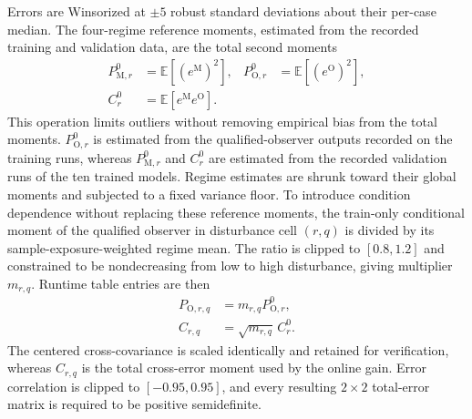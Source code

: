 \documentclass{ieeeaccess}
\begin{document}
Errors are Winsorized at $\pm5$ robust standard deviations about their per-case median. The four-regime reference moments, estimated from the recorded training and validation data, are the total second moments
\begin{equation}
\begin{aligned}
P_{\mathrm{M},r}^{0}&=\mathbb E[(e^{\mathrm{M}})^2], &
P_{\mathrm{O},r}^{0}&=\mathbb E[(e^{\mathrm{O}})^2],\\
C_{r}^{0}&=\mathbb E[e^{\mathrm{M}}e^{\mathrm{O}}].
\end{aligned}
\label{eq:fusion_empirical_moments}
\end{equation}
This operation limits outliers without removing empirical bias from the total moments. $P_{\mathrm{O},r}^{0}$ is estimated from the qualified-observer outputs recorded on the training runs, whereas $P_{\mathrm{M},r}^{0}$ and $C_r^{0}$ are estimated from the recorded validation runs of the ten trained models. Regime estimates are shrunk toward their global moments and subjected to a fixed variance floor. To introduce condition dependence without replacing these reference moments, the train-only conditional moment of the qualified observer in disturbance cell $(r,q)$ is divided by its sample-exposure-weighted regime mean. The ratio is clipped to $[0.8,1.2]$ and constrained to be nondecreasing from low to high disturbance, giving multiplier $m_{r,q}$. Runtime table entries are then
\begin{equation}
\begin{aligned}
P_{\mathrm{O},r,q}&=m_{r,q}P_{\mathrm{O},r}^{0},\\
C_{r,q}&=\sqrt{m_{r,q}}\,C_r^{0}.
\end{aligned}
\label{eq:fusion_excitation_moments}
\end{equation}
The centered cross-covariance is scaled identically and retained for verification, whereas $C_{r,q}$ is the total cross-error moment used by the online gain. Error correlation is clipped to $[-0.95,0.95]$, and every resulting $2\times2$ total-error matrix is required to be positive semidefinite.
\end{document}
